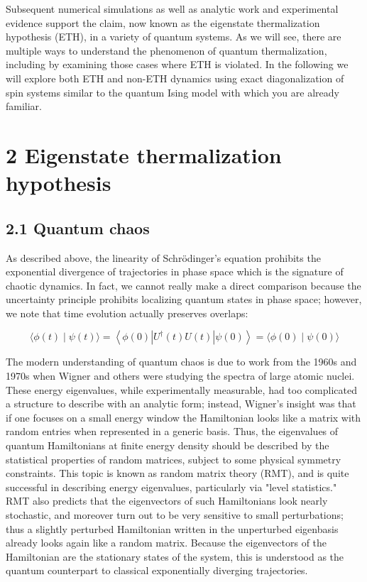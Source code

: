 \documentclass[12pt]{article}
\begin{document}
Subsequent numerical simulations as well as analytic work and experimental evidence support the claim, now known as the eigenstate thermalization hypothesis (ETH), in a variety of quantum systems. As we will see, there are multiple ways to understand the phenomenon of quantum thermalization, including by examining those cases where ETH is violated. In the following we will explore both ETH and non-ETH dynamics using exact diagonalization of spin systems similar to the quantum Ising model with which you are already familiar.

\section*{2 Eigenstate thermalization hypothesis}
\subsection*{2.1 Quantum chaos}
As described above, the linearity of Schrödinger's equation prohibits the exponential divergence of trajectories in phase space which is the signature of chaotic dynamics. In fact, we cannot really make a direct comparison because the uncertainty principle prohibits localizing quantum states in phase space; however, we note that time evolution actually preserves overlaps:


\begin{equation*}
\langle\phi(t) \mid \psi(t)\rangle=\left\langle\phi(0)\left|U^{\dagger}(t) U(t)\right| \psi(0)\right\rangle=\langle\phi(0) \mid \psi(0)\rangle \tag{1}
\end{equation*}


The modern understanding of quantum chaos is due to work from the 1960s and 1970s when Wigner and others were studying the spectra of large atomic nuclei. These energy eigenvalues, while experimentally measurable, had too complicated a structure to describe with an analytic form; instead, Wigner's insight was that if one focuses on a small energy window the Hamiltonian looks like a matrix with random entries when represented in a generic basis. Thus, the eigenvalues of quantum Hamiltonians at finite energy density should be described by the statistical properties of random matrices, subject to some physical symmetry constraints. This topic is known as random matrix theory (RMT), and is quite successful in describing energy eigenvalues, particularly via "level statistics." RMT also predicts that the eigenvectors of such Hamiltonians look nearly stochastic, and moreover turn out to be very sensitive to small perturbations; thus a slightly perturbed Hamiltonian written in the unperturbed eigenbasis already looks again like a random matrix. Because the eigenvectors of the Hamiltonian are the stationary states of the system, this is understood as the quantum counterpart to classical exponentially diverging trajectories.
\end{document}
